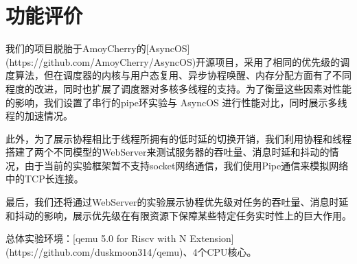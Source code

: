 \section{功能评价}

我们的项目脱胎于AmoyCherry的[AsyncOS](https://github.com/AmoyCherry/AsyncOS)开源项目，采用了相同的优先级的调度算法，但在调度器的内核与用户态复用、异步协程唤醒、内存分配方面有了不同程度的改进，同时也扩展了调度器对多核多线程的支持。为了衡量这些因素对性能的影响，我们设置了串行的pipe环实验与 AsyncOS 进行性能对比，同时展示多线程的加速情况。

此外，为了展示协程相比于线程所拥有的低时延的切换开销，我们利用协程和线程搭建了两个不同模型的WebServer来测试服务器的吞吐量、消息时延和抖动的情况，由于当前的实验框架暂不支持socket网络通信，我们使用Pipe通信来模拟网络中的TCP长连接。

最后，我们还将通过WebServer的实验展示协程优先级对任务的吞吐量、消息时延和抖动的影响，展示优先级在有限资源下保障某些特定任务实时性上的巨大作用。

总体实验环境：[qemu 5.0 for Riscv with N Extension](https://github.com/duskmoon314/qemu)、4个CPU核心。

